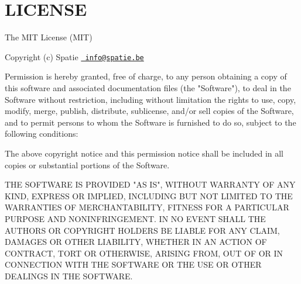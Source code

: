 \chapter{LICENSE}
\hypertarget{md_vendor_2spatie_2laravel-ignition_2_l_i_c_e_n_s_e}{}\label{md_vendor_2spatie_2laravel-ignition_2_l_i_c_e_n_s_e}
The MIT License (MIT)

Copyright (c) Spatie \href{mailto:info@spatie.be}{\texttt{ info@spatie.\+be}}

Permission is hereby granted, free of charge, to any person obtaining a copy of this software and associated documentation files (the "{}\+Software"{}), to deal in the Software without restriction, including without limitation the rights to use, copy, modify, merge, publish, distribute, sublicense, and/or sell copies of the Software, and to permit persons to whom the Software is furnished to do so, subject to the following conditions\+:

The above copyright notice and this permission notice shall be included in all copies or substantial portions of the Software.

THE SOFTWARE IS PROVIDED "{}\+AS IS"{}, WITHOUT WARRANTY OF ANY KIND, EXPRESS OR IMPLIED, INCLUDING BUT NOT LIMITED TO THE WARRANTIES OF MERCHANTABILITY, FITNESS FOR A PARTICULAR PURPOSE AND NONINFRINGEMENT. IN NO EVENT SHALL THE AUTHORS OR COPYRIGHT HOLDERS BE LIABLE FOR ANY CLAIM, DAMAGES OR OTHER LIABILITY, WHETHER IN AN ACTION OF CONTRACT, TORT OR OTHERWISE, ARISING FROM, OUT OF OR IN CONNECTION WITH THE SOFTWARE OR THE USE OR OTHER DEALINGS IN THE SOFTWARE. 